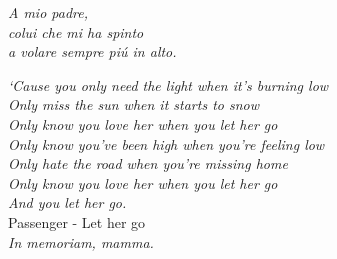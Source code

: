 \thispagestyle{plain}
\phantom{\tiny test}

\vspace{7cm} 



\begin{flushright}

\itshape
A mio padre,\\
colui che mi ha spinto\\
a volare sempre pi\'u in alto.
\end{flushright}


\cleardoublepage

\thispagestyle{plain}
\phantom{\tiny test}

\vspace{7cm} 



\begin{flushright}

{\itshape
`Cause you only need the light when it's burning low\\
Only miss the sun when it starts to snow\\
Only know you love her when you let her go\\
Only know you've been high when you're feeling low\\
Only hate the road when you're missing home\\
Only know you love her when you let her go\\
And you let her go.\\}
Passenger - Let her go\\
\vspace{0.5cm}
{\itshape
In memoriam, mamma.}
\end{flushright}

\cleardoublepage
